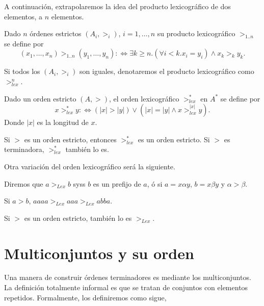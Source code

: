 A continuación, extrapolaremos la idea del producto lexicográfico de dos
elementos, a $n$ elementos.

\begin{defi}
  Dado $n$ órdenes estrictos $(A_i,>_i)$, $i=1,\dots,n$ su producto
  lexicográfico $>_{1..n}$ se define por
  \[(x_1,\dots,x_n) >_{1..n}  (y_1,\dots,y_n) :\Leftrightarrow 
    \exists k \geq n. (\forall i < k. x_i = y_i) \wedge x_k >_k y_k.\]
\end{defi} 

\begin{nota} 
  Si todos los $(A_i,>_i)$ son iguales, denotaremos el producto lexicográfico
  como $>^n_{lex}$.
\end{nota}


\begin{defi}
  Dado un orden estricto $(A,>)$, el orden lexicográfico $>^*_{lex}$ en $A^*$
  se define por
  \[x >^*_{lex} y :\Leftrightarrow (|x| > |y|) \vee (|x| = |y| \wedge x >^{|x|}_{lex} y).\]
  Donde $|x|$ es la longitud de $x$.
\end{defi} 

\begin{lema}
  Si $>$ es un orden estricto, entonces $>^*_{lex}$ es un orden estricto. Si $>$ es
  terminadora, $>^*_{lex}$ también lo es.
\end{lema}

Otra variación del orden lexicográfico será la siguiente.

\begin{defi}
  Diremos que $a >_{Lex} b$ syss $b$ es un prefijo de $a$, ó si
  $a = x \alpha y$, $b = x \beta y$ y $\alpha > \beta$.
\end{defi}

\begin{ejem}
  Si $a>b$, $aaaa >_{Lex} aaa >_{Lex} abba$.
\end{ejem}

\begin{lema}
  Si $>$ es un orden estricto, también lo es $>_{Lex}$.
\end{lema}

\section{Multiconjuntos y su orden}\label{ormult}

Una manera de construir órdenes terminadores es mediante los multiconjuntos. La
definición totalmente informal es que se tratan de conjuntos con elementos
repetidos. Formalmente, los definiremos como sigue,

